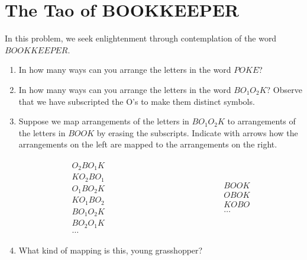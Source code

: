 \documentclass[12pt]{article}
\begin{document}


\section{The Tao of BOOKKEEPER}

 In this problem, we seek enlightenment through contemplation
of the word $BOOKKEEPER$.

\begin{enumerate}

\item In how many ways can you arrange the letters in the word
$POKE$?


\item In how many ways can you arrange the letters in the word
$BO_1O_2K$?  Observe that we have subscripted the O's to make them
distinct symbols.


\item Suppose we map arrangements of the letters in $BO_1O_2K$ to
arrangements of the letters in $BOOK$ by erasing the subscripts.
Indicate with arrows how the arrangements on the left are mapped to
the arrangements on the right.

\[
\begin{array}{lcl}
\begin{array}{l}
O_2BO_1K \\
KO_2BO_1 \\
O_1BO_2K \\
KO_1BO_2 \\
BO_1O_2K \\
BO_2O_1K \\
\ldots
\end{array}
& \hspace{2in} &
\begin{array}{l}
BOOK \\
OBOK \\
KOBO \\
\ldots
\end{array}
\end{array}
\]

\item What kind of mapping is this, young grasshopper?


\end{enumerate}
\end{document}

